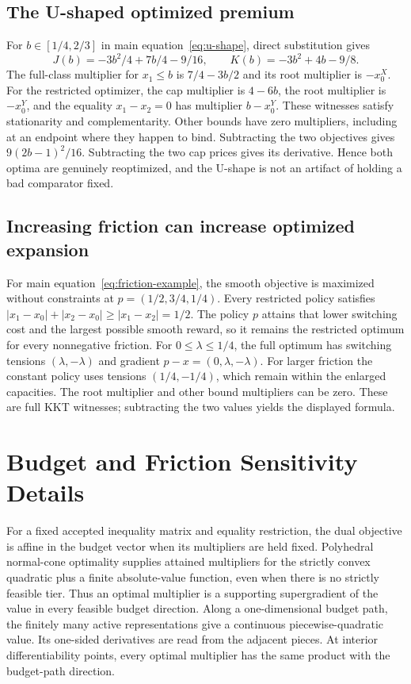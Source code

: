 \documentclass[11pt,letterpaper]{article}
\theoremstyle{definition}\newtheorem{remark}[theorem]{Remark}
\begin{document}
\subsection{The U-shaped optimized premium}
For $b\in[1/4,2/3]$ in main equation~\eqref{eq:u-shape}, direct substitution gives
\[
 J(b)=-3b^2/4+7b/4-9/16,\qquad
 K(b)=-3b^2+4b-9/8.
\]
The full-class multiplier for $x_1\leq b$ is $7/4-3b/2$ and its root multiplier is $-x_0^X$. For the restricted optimizer, the cap multiplier is $4-6b$, the root multiplier is $-x_0^Y$, and the equality $x_1-x_2=0$ has multiplier $b-x_0^Y$. These witnesses satisfy stationarity and complementarity. Other bounds have zero multipliers, including at an endpoint where they happen to bind. Subtracting the two objectives gives $9(2b-1)^2/16$. Subtracting the two cap prices gives its derivative. Hence both optima are genuinely reoptimized, and the U-shape is not an artifact of holding a bad comparator fixed.

\subsection{Increasing friction can increase optimized expansion}
For main equation~\eqref{eq:friction-example}, the smooth objective is maximized without constraints at $p=(1/2,3/4,1/4)$. Every restricted policy satisfies
$|x_1-x_0|+|x_2-x_0|\geq|x_1-x_2|=1/2$.
The policy $p$ attains that lower switching cost and the largest possible smooth reward, so it remains the restricted optimum for every nonnegative friction. For $0\leq\lambda\leq1/4$, the full optimum has switching tensions $(\lambda,-\lambda)$ and gradient $p-x=(0,\lambda,-\lambda)$. For larger friction the constant policy uses tensions $(1/4,-1/4)$, which remain within the enlarged capacities. The root multiplier and other bound multipliers can be zero. These are full KKT witnesses; subtracting the two values yields the displayed formula.

\section{Budget and Friction Sensitivity Details}\label{ec:rents}
For a fixed accepted inequality matrix and equality restriction, the dual objective is affine in the budget vector when its multipliers are held fixed. Polyhedral normal-cone optimality supplies attained multipliers for the strictly convex quadratic plus a finite absolute-value function, even when there is no strictly feasible tier. Thus an optimal multiplier is a supporting supergradient of the value in every feasible budget direction. Along a one-dimensional budget path, the finitely many active representations give a continuous piecewise-quadratic value. Its one-sided derivatives are read from the adjacent pieces. At interior differentiability points, every optimal multiplier has the same product with the budget-path direction.
\end{document}
